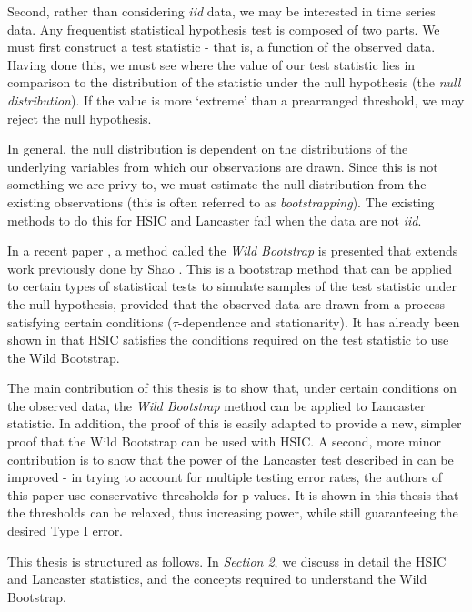 \documentclass[12pt]{article}
\numberwithin{claim}{section}
\numberwithin{lemma}{section}
\numberwithin{theorem}{section}
\begin{document}
Second, rather than considering \emph{iid} data, we may be interested in time series data. Any frequentist statistical hypothesis test is composed of two parts. We must first construct a test statistic - that is, a function of the observed data. Having done this, we must see where the value of our test statistic lies in comparison to the distribution of the statistic under the null hypothesis (the \emph{null distribution}). If the value is more `extreme' than a prearranged threshold, we may reject the null hypothesis.

In general, the null distribution is dependent on the distributions of the underlying variables from which our observations are drawn. Since this is not something we are privy to, we must estimate the null distribution from the existing observations (this is often referred to as \emph{bootstrapping}). The existing methods to do this for HSIC and Lancaster fail when the data are not \emph{iid}.

In a recent paper \cite{leucht2013dependent}, a method called the \emph{Wild Bootstrap} is presented that extends work previously done by Shao \cite{shao2010dependent}. This is a bootstrap method that can be applied to certain types of statistical tests to simulate samples of the test statistic under the null hypothesis, provided that the observed data are drawn from a process satisfying certain conditions ($\tau$-dependence and stationarity). It has already been shown in \cite{chwialkowski2014kernel} that HSIC satisfies the conditions required on the test statistic to use the Wild Bootstrap.

The main contribution of this thesis is to show that, under certain conditions on the observed data, the \emph{Wild Bootstrap} method can be applied to Lancaster statistic. In addition, the proof of this is easily adapted to provide a new, simpler proof that the Wild Bootstrap can be used with HSIC. A second, more minor contribution is to show that the power of the Lancaster test described in \cite{sejdinovic2013kernel} can be improved - in trying to account for multiple testing error rates, the authors of this paper use conservative thresholds for p-values. It is shown in this thesis that the thresholds can be relaxed, thus increasing power, while still guaranteeing the desired Type I error.

This thesis is structured as follows. In \emph{Section 2}, we discuss in detail the HSIC and Lancaster statistics, and the concepts required to understand the Wild Bootstrap.
\end{document}
